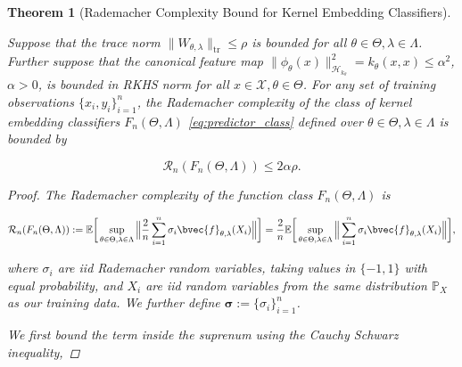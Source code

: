 \documentclass{article}
\newtheorem{theorem}{Theorem}[section]
\begin{document}
		\begin{theorem}[Rademacher Complexity Bound for Kernel Embedding Classifiers]
		\label{thm:rademacher_complexity_bound}
		
			Suppose that the trace norm $\| W_{\theta, \lambda} \|_{\mathrm{tr}} \leq \rho$ is bounded for all $\theta \in \Theta, \lambda \in \Lambda$. Further suppose that the canonical feature map $\| \phi_{\theta}(x) \|_{\mathcal{H}_{k_{\theta}}}^{2} = k_{\theta}(x, x) \leq \alpha^{2}$, $\alpha > 0$, is bounded in RKHS norm for all $x \in \mathcal{X}, \theta \in \Theta$. For any set of training observations $\{x_{i}, y_{i}\}_{i = 1}^{n}$, the Rademacher complexity of the class of kernel embedding classifiers $F_{n}(\Theta, \Lambda)$ \eqref{eq:predictor_class} defined over $\theta \in \Theta, \lambda \in \Lambda$ is bounded by
				
			\begin{equation}
				\mathcal{R}_{n}(F_{n}(\Theta, \Lambda)) \leq 2 \alpha \rho.
			\label{eq:rademacher_complexity_bound}
			\end{equation}
	
			\begin{proof}
			
				The Rademacher complexity \citep[Definition 2]{bartlett2002rademacher} of the function class $F_{n}(\Theta, \Lambda)$ is 
				
				\begin{equation}
					\mathcal{R}_{n}(F_{n}(\Theta, \Lambda)) := \mathbb{E}\bigg[\sup_{\theta \in \Theta, \lambda \in \Lambda} \Big\| \frac{2}{n} \sum_{i = 1}^{n} \sigma_{i}\bvec{f}_{\theta, \lambda}(X_{i}) \Big\|\bigg] = \frac{2}{n} \mathbb{E}\bigg[\sup_{\theta \in \Theta, \lambda \in \Lambda} \Big\| \sum_{i = 1}^{n} \sigma_{i}\bvec{f}_{\theta, \lambda}(X_{i}) \Big\|\bigg],
				\end{equation}
				
				where $\sigma_{i}$ are \textit{iid} Rademacher random variables, taking values in $\{-1, 1\}$ with equal probability, and $X_{i}$ are \textit{iid} random variables from the same distribution $\mathbb{P}_{X}$ as our training data. We further define $\bm{\sigma} := \{\sigma_{i}\}_{i = 1}^{n}$.
				
				We first bound the term inside the suprenum using the Cauchy Schwarz inequality,
				

\end{proof}
\end{theorem}
\end{document}
